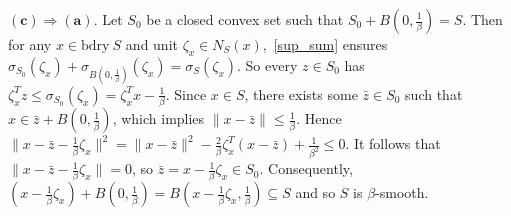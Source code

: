 \documentclass[sn-mathphys,Numbered]{sn-jnl}%
\newcommand{\bdry}{\mathrm{bdry\ }}
\begin{document}
\begin{appendices}
{\noindent $\mathbf{(c) \Rightarrow (a)}$.
Let $S_0$ be a closed convex set such that $S_0+B(0,\frac{1}{\beta})=S$. Then for any $x \in \bdry S$ and unit $\zeta_x \in N_S(x)$,~\eqref{sup_sum} ensures $\sigma_{S_0}(\zeta_x)+\sigma_{B(0,\frac{1}{\beta})}(\zeta_x)=\sigma_S(\zeta_x)$.
So every $z\in S_0$ has $\zeta_x^Tz \leq \sigma_{S_0}(\zeta_x)=\zeta_x^Tx-\frac{1}{\beta}$. Since $x \in S$, there exists some $\bar z\in S_0$ such that $x\in \bar z+B(0,\frac{1}{\beta})$, which implies $\|x-\bar z\| \leq \frac{1}{\beta}$. Hence $\|x-\bar z -\frac{1}{\beta}\zeta_x\|^2=\|x-\bar z\|^2-\frac{2}{\beta}\zeta_x^T(x-\bar z)+\frac{1}{\beta^2} \leq 0$. It follows that $\|x-\bar z -\frac{1}{\beta}\zeta_x\|=0$, so $\bar z=x-\frac{1}{\beta}\zeta_x \in S_0$. Consequently, $(x-\frac{1}{\beta}\zeta_x)+B(0,\frac{1}{\beta})=B(x-\frac{1}{\beta}\zeta_x, \frac{1}{\beta}) \subseteq S$ and so $S$ is $\beta$-smooth.









}
\end{appendices}
\end{document}
